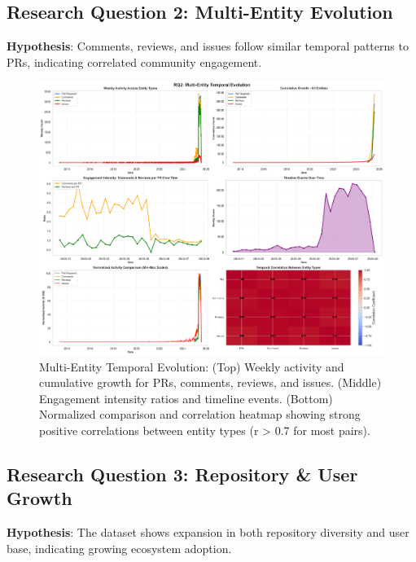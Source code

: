 \documentclass[11pt]{article}
\begin{document}
\subsection{Research Question 2: Multi-Entity Evolution}

\textbf{Hypothesis}: Comments, reviews, and issues follow similar temporal patterns to PRs, indicating correlated community engagement.

\begin{figure}[H]
\centering
\includegraphics[width=\textwidth]{figures/temporal_02_multi_entity_evolution.png}
\caption{Multi-Entity Temporal Evolution: (Top) Weekly activity and cumulative growth for PRs, comments, reviews, and issues. (Middle) Engagement intensity ratios and timeline events. (Bottom) Normalized comparison and correlation heatmap showing strong positive correlations between entity types (r > 0.7 for most pairs).}
\label{fig:temporal_multi}
\end{figure}

\subsection{Research Question 3: Repository \& User Growth}

\textbf{Hypothesis}: The dataset shows expansion in both repository diversity and user base, indicating growing ecosystem adoption.
\end{document}
